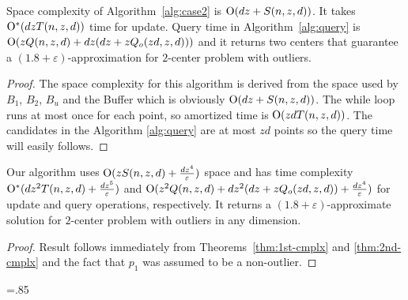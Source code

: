 \documentclass[envcountsame]{cls/cccg15}
\newcommand{\cO}{\ensuremath{{\rm O}}}
\newcommand{\lee}{\leqslant}
\renewcommand{\le}{\lee}
\newcommand{\eps}{\varepsilon}
\begin{document}
\begin{theorem}
\label{thm:2nd-cmplx}
Space complexity of Algorithm~\ref{alg:case2} is $\cO(dz+S(n,z,d))$. It takes $\cO^*(dzT(n,z,d))$ time for update. Query time in Algorithm~\ref{alg:query} is $\cO(zQ(n,z,d) + dz(dz+zQ_o(zd,z,d)))$ and it returns two centers that guarantee a $(1.8 + \eps)$-approximation for $2$-center problem with outliers.
\end{theorem}

\begin{proof}
The space complexity for this algorithm is derived from the space used by $B_1$, $B_2$, $B_u$ and the Buffer which is obviously $\cO(dz+S(n,z,d))$. The while loop runs at most once for each point, so amortized time is $\cO(zdT(n,z,d))$. The candidates in the Algorithm \ref{alg:query} are at most $zd$ points  so the query time will easily follows.
\end{proof}

\begin{theorem}
Our algorithm uses $\cO(zS(n, z, d) + \frac{dz^4}{\eps})$ space and has time complexity $\cO^*(dz^2T(n,z,d) + \frac{dz^5}{\eps})$ and $\cO(z^2Q(n,z,d) + dz^2(dz+zQ_o(zd,z,d)) + \frac{dz^4}{\eps})$ for update and query operations, respectively. It returns a $(1.8 + \eps)$-approximate solution for $2$-center problem with outliers in any dimension.
\end{theorem}
\begin{proof}
Result follows immediately from Theorems~\ref{thm:1st-cmplx} and \ref{thm:2nd-cmplx} and the fact that $p_1$ was assumed to be a non-outlier.
\end{proof}


\small
\baselineskip=.85\baselineskip


\end{document}
